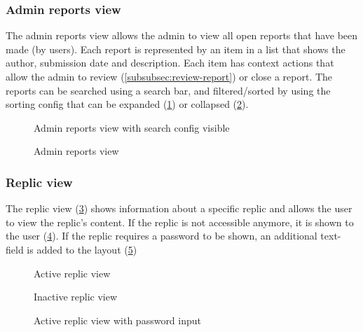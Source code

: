 \subsubsection{Admin reports view}
The admin reports view allows the admin to view all open reports that have been made (by users).
Each report is represented by an item in a list that shows the author, submission date and description.
Each item has context actions that allow the admin to review (\ref{subsubsec:review-report}) or close a report.
The reports can be searched using a search bar, and filtered/sorted by using the sorting config that can be expanded (\ref{fig:web-reports-config-view}) or collapsed (\ref{fig:web-reports-noconfig-view}).
\begin{figure}
    \centering

    \caption{Admin reports view with search config visible}
    \label{fig:web-reports-config-view}
\end{figure}
\begin{figure}
    \centering

    \caption{Admin reports view}
    \label{fig:web-reports-noconfig-view}
\end{figure}

\subsubsection{Replic view}
The replic view (\ref{fig:web-replic-active-view}) shows information about a specific replic and allows the user to view the replic's content.
If the replic is not accessible anymore, it is shown to the user (\ref{fig:web-replic-inactive-view}).
If the replic requires a password to be shown, an additional text-field is added to the layout (\ref{fig:web-replic-active-password-view})
\begin{figure}
    \centering

    \caption{Active replic view}
    \label{fig:web-replic-active-view}
\end{figure}
\begin{figure}
    \centering

    \caption{Inactive replic view}
    \label{fig:web-replic-inactive-view}
\end{figure}
\begin{figure}
    \centering

    \caption{Active replic view with password input}
    \label{fig:web-replic-active-password-view}
\end{figure}

